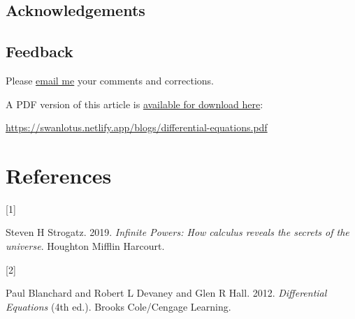 \documentclass[
  a4paper,
]{article}
\newlength{\cslhangindent}
\newlength{\csllabelwidth}
\newenvironment{CSLReferences}[2] %
 {\begin{list}{}{%
  \setlength{\itemindent}{0pt}
  \setlength{\leftmargin}{0pt}
  \setlength{\parsep}{0pt}
  \ifodd #1
   \setlength{\leftmargin}{\cslhangindent}
   \setlength{\itemindent}{-1\cslhangindent}
  \fi
  \setlength{\itemsep}{#2\baselineskip}}}
 {\end{list}}
\newcommand{\CSLLeftMargin}[1]{\parbox[t]{\csllabelwidth}{\strut#1\strut}}
\newcommand{\CSLRightInline}[1]{\parbox[t]{\linewidth - \csllabelwidth}{\strut#1\strut}}
\begin{document}
\subsection{Acknowledgements}\label{acknowledgements}

\subsection{Feedback}\label{feedback}

Please \href{mailto:feedback.swanlotus@gmail.com}{email me} your
comments and corrections.

\noindent A PDF version of this article is
\href{./differetial-equations.pdf}{available for download here}:

\begin{sffamily}

\url{https://swanlotus.netlify.app/blogs/differential-equations.pdf}

\end{sffamily}

\section*{References}\label{bibliography}

\label{refs}
\begin{CSLReferences}{0}{0}
\CSLLeftMargin{{[}1{]} }%
\CSLRightInline{Steven H Strogatz. 2019. \emph{{Infinite Powers}: {How
calculus reveals the secrets of the universe}}. Houghton Mifflin
Harcourt.}

\CSLLeftMargin{{[}2{]} }%
\CSLRightInline{Paul Blanchard and Robert L Devaney and Glen R Hall.
2012. \emph{{Differential Equations}} (4th ed.). Brooks Cole/Cengage
Learning.}

\end{CSLReferences}
\end{document}
